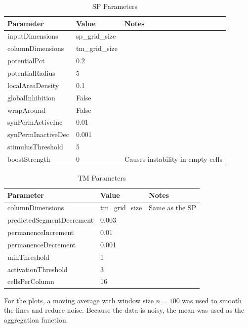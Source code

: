 \begin{table}[H]
    \centering
    \begin{tabularx}{\linewidth}{@{}XlX@{}}
        \toprule
        \textbf{Parameter} & \textbf{Value} & \textbf{Notes}                    \\
        \midrule
        inputDimensions    & sp\_grid\_size &                                   \\
        columnDimensions   & tm\_grid\_size &                                   \\
        potentialPct       & 0.2            &                                   \\
        potentialRadius    & 5              &                                   \\
        localAreaDensity   & 0.1            &                                   \\
        globalInhibition   & False          &                                   \\
        wrapAround         & False          &                                   \\
        synPermActiveInc   & 0.01           &                                   \\
        synPermInactiveDec & 0.001                                              \\
        stimulusThreshold  & 5              &                                   \\
        boostStrength      & 0              & Causes instability in empty cells \\
        \bottomrule
    \end{tabularx}
    \caption{SP Parameters}
    \label{tab:sperm_sp_param}
\end{table}
\begin{table}[H]
    \centering
    \begin{tabularx}{\linewidth}{@{}XlX@{}}
        \toprule
        \textbf{Parameter}        & \textbf{Value} & \textbf{Notes} \\
        \midrule
        columnDimensions          & tm\_grid\_size & Same as the SP \\
        predictedSegmentDecrement & 0.003          &                \\
        permanenceIncrement       & 0.01           &                \\
        permanenceDecrement       & 0.001          &                \\
        minThreshold              & 1              &                \\
        activationThreshold       & 3              &                \\
        cellsPerColumn            & 16             &                \\
        \bottomrule
    \end{tabularx}
    \caption{TM Parameters}
    \label{tab:sperm_tm_param}
\end{table}
For the plots, a moving average with window size $n=100$ was used to smooth the lines and reduce noise. Because the data is noisy, the mean was used as the aggregation function.
